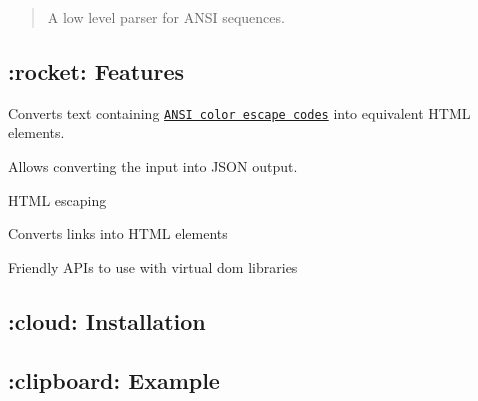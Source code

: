 \href{https://www.patreon.com/ionicabizau}{\tt } \href{https://www.paypal.com/cgi-bin/webscr?cmd=_s-xclick&hosted_button_id=RVXDDLKKLQRJW}{\tt } \href{https://github.com/IonicaBizau/ama}{\tt } \href{https://travis-ci.org/IonicaBizau/anser/}{\tt } \href{https://www.npmjs.com/package/anser}{\tt } \href{https://www.npmjs.com/package/anser}{\tt } \href{https://www.codementor.io/johnnyb?utm_source=github&utm_medium=button&utm_term=johnnyb&utm_campaign=github}{\tt }

\begin{quote}
A low level parser for A\+N\+SI sequences. \end{quote}


\subsection*{\+:rocket\+: Features}


\begin{DoxyItemize}
\item Converts text containing \href{http://en.wikipedia.org/wiki/ANSI_escape_code#Colors}{\tt A\+N\+SI color escape codes} into equivalent H\+T\+ML elements.
\item Allows converting the input into J\+S\+ON output.
\item H\+T\+ML escaping
\item Converts links into H\+T\+ML elements
\item Friendly A\+P\+Is to use with virtual dom libraries
\end{DoxyItemize}

\subsection*{\+:cloud\+: Installation}




\subsection*{\+:clipboard\+: Example}


